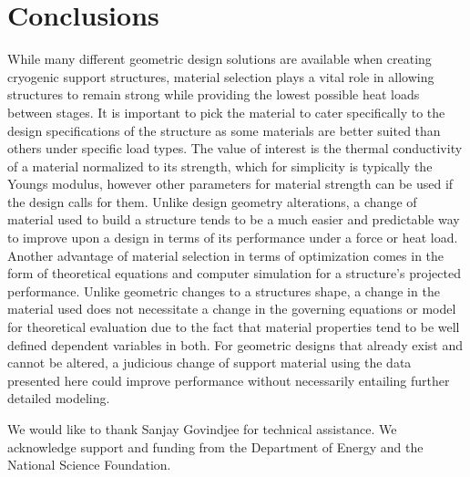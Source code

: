 \documentclass[final]{svjour2}
\begin{document}
\section{Conclusions}
While many different geometric design solutions are available when creating cryogenic support structures, material selection plays a vital role in allowing structures to remain strong while providing the lowest possible heat loads between stages.  It is important to pick the material to cater specifically to the design specifications of the structure as some materials are better suited than others under specific load types.  The value of interest is the thermal conductivity of a material normalized to its strength, which for simplicity is typically the Youngs modulus, however other parameters for material strength can be used if the design calls for them.  Unlike design geometry alterations, a change of material used to build a structure tends to be a much easier and predictable way to improve upon a design in terms of its performance under a force or heat load. Another advantage of material selection in terms of optimization comes in the form of theoretical equations and computer simulation for a structure's projected performance.  Unlike geometric changes to a structures shape, a change in the material used does not necessitate a change in the governing equations or model for theoretical evaluation due to the fact that material properties tend to be well defined dependent variables in both.  For geometric designs that already exist and cannot be altered, a judicious change of support material using the data presented here could improve performance without necessarily entailing further detailed modeling.

\begin{acknowledgements}
We would like to thank Sanjay Govindjee for technical assistance. We acknowledge support and funding from the Department of Energy and the National Science Foundation.
\end{acknowledgements}
\end{document}
